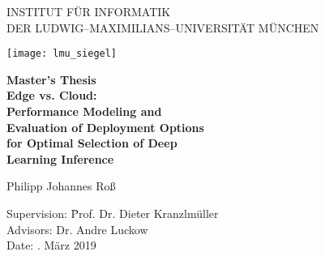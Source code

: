 \begin{center}

\vspace*{-2cm}

{\Huge INSTITUT FÜR INFORMATIK\\[1mm]}
DER LUDWIG--MAXIMILIANS--UNIVERSITÄT MÜNCHEN\\

\vspace*{1cm}

\texttt{[image: lmu\_siegel]}

\vspace*{2cm}

{\Large \textbf{Master's Thesis}}\\ %

\vspace{2.0cm}
{\Huge \textbf{Edge vs. Cloud:}}\\
\vspace*{2.0mm}
{\Huge \textbf{Performance Modeling and}}\\
\vspace*{2.0mm}
{\Huge \textbf{Evaluation of Deployment Options}}\\
 \vspace*{2.0mm}
{\Huge \textbf{for Optimal Selection of Deep}}\\
 \vspace*{2.0mm}
{\Huge \textbf{Learning Inference}}\\
\vspace{1.0cm}

{\LARGE Philipp Johannes Roß} %
\vspace{2cm}

\parbox{1cm}{
\begin{large}
\begin{tabbing}
Supervision: \hspace{.5cm} \=Prof. Dr. Dieter Kranzlmüller\\[2mm]
Advisors:
\>Dr. Andre Luckow\\[2mm]
Date: . M\"arz 2019\\
\end{tabbing}
\end{large}}\\
\vspace{5mm}

\end{center}
